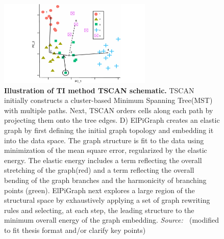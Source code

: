 \begin{itemize}
    \begin{figure}[ht!]
    	\centering
    	\includegraphics[width=0.65\textwidth]{TI_Alg_TSCAN/fig}
    	\vspace{0.1cm}
    	\caption[Illustration of TI method TSCAN schematic.]{\textbf{Illustration of TI method TSCAN schematic.}
    	TSCAN initially constructs a cluster-based Minimum Spanning Tree(MST) with multiple paths. Next, TSCAN orders cells along each path by projecting them onto the tree edges. 
    	D) ElPiGraph creates an elastic graph by first defining the initial graph topology and embedding it into the data space. The graph structure is fit to the data using minimization of the mean square error, regularized by the elastic energy. The elastic energy includes a term reflecting the overall stretching of the graph(red) and a term reflecting the overall bending of the graph branches and the harmonicity of branching points (green). ElPiGraph next explores a large region of the structural space by exhaustively applying a set of graph rewriting rules and selecting, at each step, the leading structure to the minimum overall energy of the graph embedding. \emph{Source: ~\cite{ji2016tscan}}(modified to fit thesis format and/or clarify key points)
    	}
    	\label{fig:TI_Alg_TSCAN}
    \end{figure}
\end{itemize}

